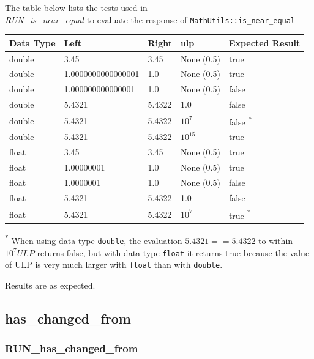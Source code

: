 \documentclass[11pt,fleqn]{report}
\begin{document}
The table below lists the tests used in \\ \textit{RUN\_is\_near\_equal} to evaluate
the response of \texttt{MathUtils::is\_near\_equal}
\begin{center}
\begin{tabular}{|l||l|l|l|l|}
\hline
 \textbf{Data Type} & \textbf{Left} & \textbf{Right} &
 \textbf{ulp} & \textbf {Expected Result} \\
\hline \hline
double & 3.45 & 3.45 & None (0.5) & true \\
double & 1.0000000000000001 & 1.0& None (0.5) & true \\
double & 1.000000000000001& 1.0& None (0.5) & false \\
double & 5.4321 & 5.4322 & 1.0& false \\
double & 5.4321 & 5.4322 & $10^{7}$ & false \textsuperscript{*} \\
double & 5.4321 & 5.4322 & $10^{15}$& true \\
float &3.45 & 3.45 & None (0.5) & true \\
float &1.00000001 & 1.0& None (0.5) & true \\
float &1.0000001& 1.0& None (0.5) & false \\
float &5.4321 & 5.4322 & 1.0& false \\
float &5.4321 & 5.4322 & $10^{7}$ & true \textsuperscript{*}\\
\hline \hline
\end{tabular}
\end{center}
\textsuperscript{*} When using data-type \texttt{double}, the evaluation
$ 5.4321 == 5.4322$ to within $10^7 ULP$ returns false, but with data-type
\texttt{float} it returns true because the value of ULP is very much
larger with \texttt{float} than with \texttt{double}.

Results are as expected.

\subsection{has\_changed\_from}
\subsubsection{RUN\_has\_changed\_from}
\end{document}
